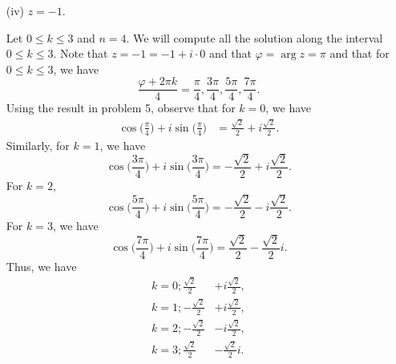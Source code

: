 \documentclass[a4paper]{article}
\begin{document}
\begin{enumerate}
\begin{solution}
                \end{solution}
            \item[(iv)] \( z = -1  \).
                \begin{solution}
                Let \( 0 \leq k \leq 3   \) and \( n = 4  \). We will compute all the solution along the interval \( 0 \leq k \leq 3   \). Note that \( z = -1 = -1 + i \cdot 0 \) and that \( \varphi =  \arg z = \pi  \) and that for \( 0 \leq k \leq 3 \), we have   
                \[  \frac{  \varphi + 2 \pi k   }{ 4   } = \frac{ \pi  }{ 4 }, \frac{ 3 \pi  }{ 4  },  \frac{  5 \pi  }{ 4 }, \frac{ 7 \pi  }{ 4 }.       \]
                Using the result in problem 5, observe that for \( k = 0  \), we have 
                \begin{align*}
                   \cos \Big(  \frac{  \pi  }{ 4  }   \Big)  + i \sin \Big(  \frac{ \pi  }{ 4  }  \Big) &= \frac{ \sqrt{ 2 }  }{ 2 }  + i \frac{ \sqrt{ 2 }  }{ 2 }.
                \end{align*}
                Similarly, for \( k = 1  \), we have 
                \[  \cos \Big(  \frac{ 3 \pi  }{ 4  }  \Big) + i \sin \Big(  \frac{ 3 \pi  }{  4  }  \Big) = - \frac{ \sqrt{ 2 }  }{ 2 }  + i \frac{ \sqrt{ 2 }  }{ 2 }. \]
                For \( k = 2  \), 
                \[  \cos \Big(  \frac{ 5 \pi  }{  4  }  \Big) + i \sin \Big(  \frac{ 5 \pi  }{  4  }  \Big) = - \frac{ \sqrt{ 2 }  }{ 2 }  - i \frac{ \sqrt{ 2 }  }{ 2 }. \]
                For \( k = 3  \), we have 
                \[ \cos \Big(  \frac{ 7 \pi  }{  4  }   \Big) + i\sin \Big(  \frac{ 7 \pi   }{ 4 }  \Big) = \frac{ \sqrt{ 2 }  }{ 2 }  - \frac{ \sqrt{ 2 }  }{ 2 }  i. \]
                Thus, we have 
                \begin{align*}
                    k= 0 ; \frac{ \sqrt{ 2 }  }{ 2 }  &+ i \frac{ \sqrt{ 2 }  }{ 2 }, \\  
                    k = 1 ; - \frac{ \sqrt{ 2 }  }{ 2 }  &+ i \frac{ \sqrt{ 2 }  }{ 2 }, \\
                    k = 2 ; - \frac{ \sqrt{ 2 }  }{ 2 }  &- i \frac{ \sqrt{ 2 }  }{ 2 },\\ 
                    k = 3 ; \frac{ \sqrt{ 2 }  }{ 2 }  &- \frac{ \sqrt{ 2 }  }{ 2 }  i. 
            \end{align*}

                \end{solution}
        \end{enumerate}
\end{document}
